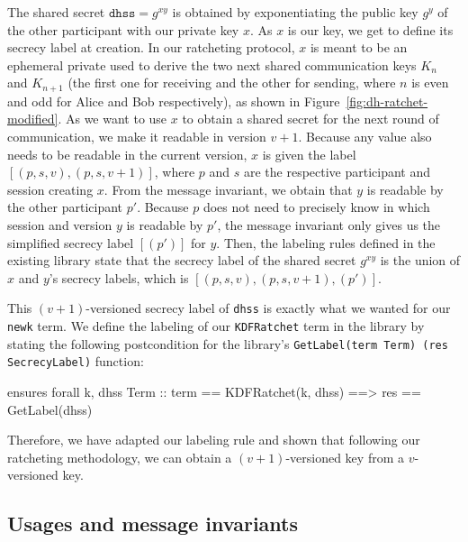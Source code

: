 The shared secret $\texttt{dhss} = g^{xy}$ is obtained by exponentiating the public key $g^y$ of the other participant with our private key $x$.
As $x$ is our key, we get to define its secrecy label at creation. 
In our ratcheting protocol, $x$ is meant to be an ephemeral private used to derive the two next shared communication keys $K_n$ and $K_{n+1}$ (the first one for receiving and the other for sending, where $n$ is even and odd for Alice and Bob respectively), as shown in Figure~\ref{fig:dh-ratchet-modified}.
As we want to use $x$ to obtain a shared secret for the next round of communication, we make it readable in version $v+1$. Because any value also needs to be readable in the current version, $x$ is given the label $[(p,s,v),(p,s,v+1)]$, where $p$ and $s$ are the respective participant and session creating $x$.
From the message invariant, we obtain that $y$ is readable by the other participant $p'$. Because $p$ does not need to precisely know in which session and version $y$ is readable by $p'$, the message invariant only gives us the simplified secrecy label $[(p')]$ for $y$.
Then, the labeling rules defined in the existing library state that the secrecy label of the shared secret $g^{xy}$ is the union of $x$ and $y$'s secrecy labels, which is $[(p,s,v),(p,s,v+1),(p')]$.

This $(v+1)$-versioned secrecy label of \texttt{dhss} is exactly what we wanted for our \texttt{newk} term.
We define the labeling of our \texttt{KDFRatchet} term in the library by stating the following postcondition for the library's \texttt{GetLabel(term Term) (res SecrecyLabel)} function:\\%
\begin{gobra}
ensures forall k, dhss Term ::
    term == KDFRatchet(k, dhss) ==> res == GetLabel(dhss)
\end{gobra}
Therefore, we have adapted our labeling rule and shown that following our ratcheting methodology, we can obtain a $(v+1)$-versioned key from a $v$-versioned key.

\subsection{Usages and message invariants}
\label{sec:usages-and-message-invariants}

